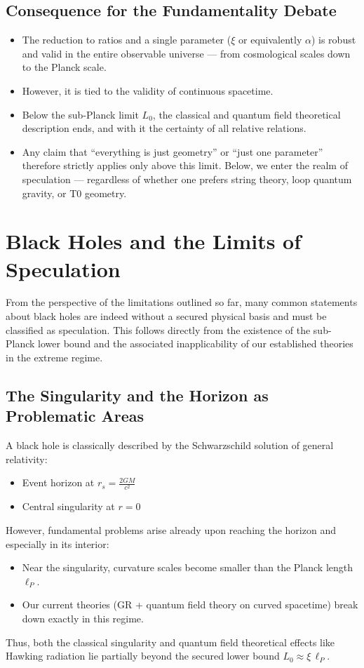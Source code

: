 	\subsection{Consequence for the Fundamentality Debate}
	\begin{itemize}
		\item The reduction to ratios and a single parameter ($\xi$ or equivalently $\alpha$) is robust and valid in the entire observable universe --- from cosmological scales down to the Planck scale.
		\item However, it is tied to the validity of continuous spacetime.
		\item Below the sub-Planck limit $L_0$, the classical and quantum field theoretical description ends, and with it the certainty of all relative relations.
		\item Any claim that ``everything is just geometry'' or ``just one parameter'' therefore strictly applies only above this limit. Below, we enter the realm of speculation --- regardless of whether one prefers string theory, loop quantum gravity, or T0 geometry.
	\end{itemize}
	
	\section{Black Holes and the Limits of Speculation}
	From the perspective of the limitations outlined so far, many common statements about black holes are indeed without a secured physical basis and must be classified as speculation. This follows directly from the existence of the sub-Planck lower bound and the associated inapplicability of our established theories in the extreme regime.
	
	\subsection{The Singularity and the Horizon as Problematic Areas}
	A black hole is classically described by the Schwarzschild solution of general relativity:
	\begin{itemize}
		\item Event horizon at $r_s = \frac{2GM}{c^2}$
		\item Central singularity at $r = 0$
	\end{itemize}
	
	However, fundamental problems arise already upon reaching the horizon and especially in its interior:
	\begin{itemize}
		\item Near the singularity, curvature scales become smaller than the Planck length $\ell_P$.
		\item Our current theories (GR + quantum field theory on curved spacetime) break down exactly in this regime.
	\end{itemize}
	Thus, both the classical singularity and quantum field theoretical effects like Hawking radiation lie partially beyond the secured lower bound $L_0 \approx \xi \, \ell_P$.
	
